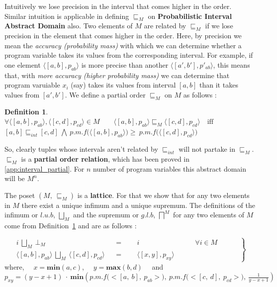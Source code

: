 \documentclass[final,3p, review, times]{Elsevier/elsarticle}
\newtheorem{definition}{Definition}[section]
\begin{document}
Intuitively we lose precision in the interval that comes higher in the order. Similar intuition is applicable in defining $\sqsubseteq_M$ on \textbf{Probabilistic Interval Abstract Domain} also. Two elements of $M$ are related by $\sqsubseteq_M$ if we lose precision in the element that comes higher in the order. Here, by precision we mean the \textit{accuracy (probability mass)} with which we can determine whether a program variable takes its values from the corresponding interval. For example, if one element $\langle[a,b],p_{ab}\rangle$ is more precise than another $\langle[a',b'],p'_{ab}\rangle$, this means that, with \textit{more accuracy (higher probability mass)} we can determine that program varuiable $x_i$ (say) takes its values from interval $[a,b]$ than it takes values from $[a',b']$. We define a partial order $\sqsubseteq_M$ on $M$ as follows :
\begin{definition}\label{abstract_order}
  $\forall \langle[a,b],p_{ab}\rangle, \langle[c,d],p_{cd}\rangle\in M\qquad\langle[a,b],p_{ab}\rangle\sqsubseteq_M\langle[c,d],p_{cd}\rangle\quad\text{iff}$\\
  $[a,b]\sqsubseteq_{int}[c,d]\ \bigwedge\ p.m.f\Big(\langle[a,b],p_{ab}\rangle\Big)\geq\ p.m.f\Big(\langle[c,d],p_{cd}\rangle\Big)$
\end{definition}
So, clearly tuples whose intervals aren't related by $\sqsubseteq_{int}$ will not partake in $\sqsubseteq_M$. $\sqsubseteq_M$ is a \textbf{partial order relation}, which has been proved in \ref{app:interval_partial}. For $n$ number of program variables this abstract domain will be $M^n$.

The poset $(M,\ \sqsubseteq_M)$ is a \textbf{lattice}. For that we show that for any two elements in $M$ there exist a unique infimum and a unique supremum. The definitions of the infimum or $l.u.b$, $\displaystyle\bigsqcup_M$ and the supremum or $g.l.b$, $\displaystyle\bigsqcap^M$ for any two elements of $M$ come from Definition~\ref{abstract_order} and are as follows :

\begin{equation}
\label{eq:lub_M}
 \left.\begin{aligned}
        i\ \bigsqcup_M\ \bot_M&&=&\quad\ \ i\qquad\qquad\qquad\qquad\text{$\forall i\in M$}\\
        \langle[a,b],p_{ab}\rangle\ \bigsqcup_M\ \langle[c,d],p_{cd}\rangle&&=&\quad\ \ \langle[x,y],p_{xy}\rangle\qquad\quad\qquad\qquad
       \end{aligned}\qquad
 \right\}
\end{equation}
where,
  $\quad x=\mathbf{min}(a,c)$,
  $\quad y=\mathbf{max}(b,d)\quad$ and\\
  $\displaystyle p_{xy}=(y-x+1)\ \cdot\ \mathbf{min}\left(p.m.f\Big(\big<[a,\ b],\ p_{ab}\big>\Big),\ p.m.f\Big(\big<[c,\ d],\ p_{cd}\big>\Big),\ \frac{1}{y-x+1}\right)$
  
\end{document}
